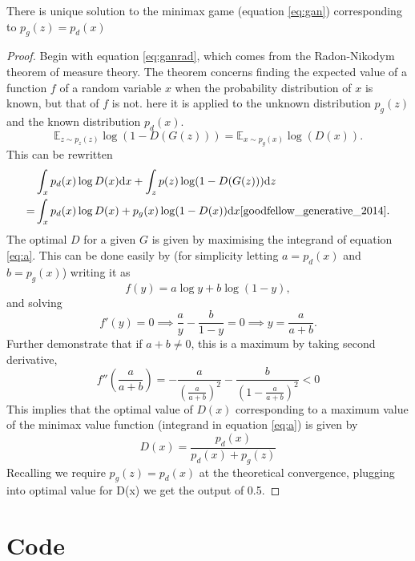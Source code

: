\documentclass[12pt,a4paper]{article}
\begin{document}
There is unique solution to the minimax game (equation \ref{eq:gan}) corresponding to $p_g(z)=p_d(x)$
\begin{proof}
Begin with equation \ref{eq:ganrad}, which comes from the Radon-Nikodym theorem of measure theory. The theorem concerns finding the expected value of a function $f$ of a random variable $x$ when the probability distribution of $x$ is known, but that of $f$ is not. here it is applied to the unknown distribution $p_g(z)$ and the known distribution $p_d(x)$.
\begin{equation}\label{eq:ganrad}
\mathbb{E}_{z \sim p_z(z)}\log(1-D(G(z)))  = \mathbb{E}_{x \sim p_g(x)}\log(D(x)). 
\end{equation}
This can be rewritten
\begin{equation} \label{eq:a}
\begin{split}
&\int_xp_d(x)\log D(x) \text{d} x + \int_zp(z)\log(1-D(G(z))) \text{d} z\\
=&\int_xp_d(x)\log D(x) + p_g(x)\log(1-D(x)) \text{d}x \cite{goodfellow_generative_2014}.
\end{split}
\end{equation}
The optimal $D$ for a given $G$ is given by maximising the integrand of equation \ref{eq:a}. This can be done easily by (for simplicity letting $a =p_d(x)$ and $b=p_g(x)$) writing it as
\begin{equation}
    f(y) = a\log y + b\log (1-y),
\end{equation}
and solving 
\begin{equation}
    f'(y) = 0 \implies \frac ay - \frac{b}{1-y} = 0 \implies y = \frac{a}{a+b}.
\end{equation}
Further demonstrate that if $a+b \ne 0$, this is a maximum by taking second derivative,
\begin{equation}
    f''(\frac{a}{a+b}) =-\frac{a}{\left(\frac{a}{a+b}\right)^2}-\frac{b}{\left(1-\frac{a}{a+b}\right)^2} < 0 
\end{equation}
This implies that the optimal value of $D(x)$ corresponding to a maximum value of the minimax value function (integrand in equation \ref{eq:a}) is given by
\begin{equation}
    D(x) = \frac{p_d(x)}{p_d(x)+p_g(z)}
\end{equation}
Recalling we require $p_g(z)=p_d(x)$ at the theoretical convergence, plugging into optimal value for D(x) we get the output of 0.5.
\end{proof}
\clearpage
\section{Code}
\end{document}
